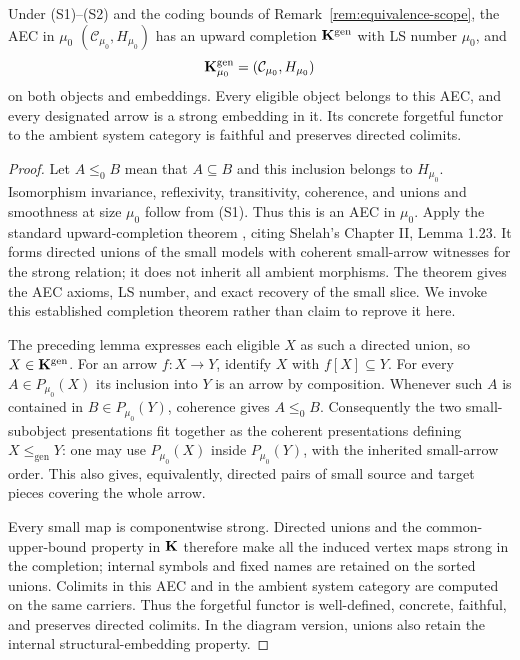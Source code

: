 \begin{theorem}
\label{thm:small-completion}
Under (S1)--(S2) and the coding bounds of
Remark~\ref{rem:equivalence-scope}, the AEC in $\mu_0$
$(\mathcal C_{\mu_0},H_{\mu_0})$ has an upward completion
$\mathbf K^{\mathrm{gen}}$ with LS number $\mu_0$, and
\[
 \mathbf K^{\mathrm{gen}}_{\mu_0}=(\mathcal C_{\mu_0},H_{\mu_0})
\]
on both objects and embeddings. Every eligible object belongs to this
AEC, and every designated arrow is a strong embedding in it. Its concrete
forgetful functor to the ambient system category is faithful and preserves
directed colimits.
\end{theorem}
\begin{proof}
Let $A\leq_0 B$ mean that $A\subseteq B$ and this inclusion belongs to
$H_{\mu_0}$. Isomorphism invariance, reflexivity, transitivity, coherence,
and unions and smoothness at size $\mu_0$ follow from (S1). Thus this is
an AEC in $\mu_0$. Apply the standard upward-completion theorem
\cite[Definition 1.0.16 and Fact 1.0.18]{jarden-shelah-frames}, citing
Shelah's Chapter II, Lemma 1.23. It forms directed unions of the small
models with coherent small-arrow witnesses for the strong relation;
it does not inherit all ambient morphisms. The theorem gives the AEC
axioms, LS number, and exact recovery of the small slice. We invoke this
established completion theorem rather than claim to reprove it here.

The preceding lemma expresses each eligible $X$ as such a directed union,
so $X\in\mathbf K^{\mathrm{gen}}$. For an arrow $f:X\to Y$, identify $X$
with $f[X]\subseteq Y$. For every $A\in P_{\mu_0}(X)$ its inclusion
into $Y$ is an arrow by composition. Whenever such $A$ is contained in
$B\in P_{\mu_0}(Y)$, coherence gives $A\leq_0 B$.
Consequently the two small-subobject presentations fit together as the
coherent presentations defining $X\leq_{\mathrm{gen}}Y$: one may use
$P_{\mu_0}(X)$ inside $P_{\mu_0}(Y)$, with the inherited small-arrow order.
This also gives, equivalently, directed pairs of small source and target
pieces covering the whole arrow.

Every small map is componentwise strong. Directed unions and the
common-upper-bound property in $\mathbf K$ therefore make all the induced
vertex maps strong in the completion; internal symbols and fixed names
are retained on the sorted unions. Colimits in this AEC and in the
ambient system category are computed on the same carriers. Thus the
forgetful functor is well-defined, concrete, faithful, and preserves
directed colimits. In the diagram version, unions also retain the
internal structural-embedding property.
\end{proof}

